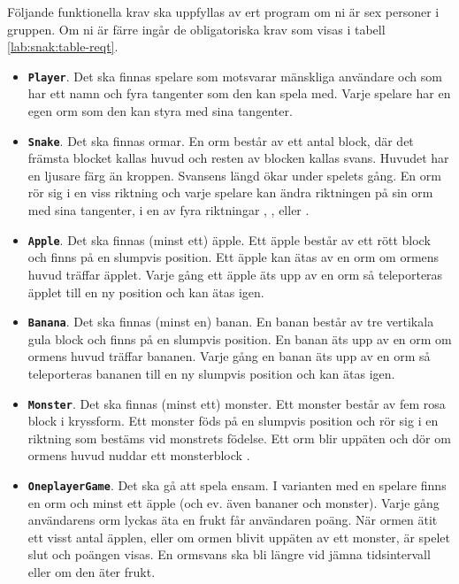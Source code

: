 Följande funktionella krav ska uppfyllas av ert program om ni är sex personer i gruppen. Om ni är färre ingår de obligatoriska krav som visas i tabell \ref{lab:snak:table-reqt}.
\begin{itemize}[nosep, label={$\square$},]
\item \textbf{\texttt{Player}}. Det ska finnas spelare som motsvarar mänskliga användare och som har ett namn och fyra tangenter som den kan spela med. Varje spelare har en egen orm som den kan styra med sina tangenter.

\item \textbf{\texttt{Snake}}. Det ska finnas ormar. En orm består av ett antal block, där det främsta blocket kallas huvud och resten av blocken kallas svans. Huvudet har en ljusare färg än kroppen. Svansens längd ökar under spelets gång. En orm rör sig i en viss riktning och varje spelare kan ändra riktningen på sin orm med sina tangenter, i en av fyra riktningar , ,  eller .

\item \textbf{\texttt{Apple}}. Det ska finnas (minst ett) äpple. Ett äpple består av ett rött block och finns på en slumpvis position. Ett äpple kan ätas av en orm om ormens huvud träffar äpplet. Varje gång ett äpple äts upp av en orm så teleporteras äpplet till en ny position och kan ätas igen.

\item \textbf{\texttt{Banana}}. Det ska finnas (minst en) banan. En banan består av tre vertikala gula block och finns på en slumpvis position. En banan äts upp av en orm om ormens huvud träffar bananen. Varje gång en banan äts upp av en orm så teleporteras bananen till en ny slumpvis position och kan ätas igen.

\item \textbf{\texttt{Monster}}. Det ska finnas (minst ett) monster. Ett monster består av fem rosa block i kryssform.  Ett monster föds på en slumpvis position och rör sig i en riktning som bestäms vid monstrets födelse. Ett orm blir uppäten och dör om ormens huvud nuddar ett monsterblock .

\item \textbf{\texttt{OneplayerGame}}. Det ska gå att spela ensam. I varianten med en spelare finns en orm och minst ett äpple (och ev. även bananer och monster). Varje gång användarens orm lyckas äta en frukt får användaren poäng. När ormen ätit ett visst antal äpplen, eller om ormen blivit uppäten av ett monster, är spelet slut och poängen visas. En ormsvans ska bli längre vid jämna tidsintervall eller om den äter frukt.


\end{itemize}

